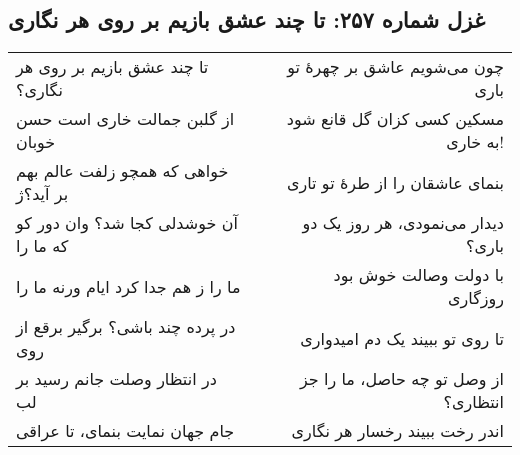\begin{center}
\section*{غزل شماره ۲۵۷: تا چند عشق بازیم بر روی هر نگاری}
\label{sec:257}
\begin{longtable}{l p{0.5cm} r}
تا چند عشق بازیم بر روی هر نگاری؟
&&
چون می‌شویم عاشق بر چهرهٔ تو باری
\\
از گلبن جمالت خاری است حسن خوبان
&&
مسکین کسی کزان گل قانع شود به خاری!
\\
خواهی که همچو زلفت عالم بهم بر آید؟ژ
&&
بنمای عاشقان را از طرهٔ تو تاری
\\
آن خوشدلی کجا شد؟ وان دور کو که ما را
&&
دیدار می‌نمودی، هر روز یک دو باری؟
\\
ما را ز هم جدا کرد ایام ورنه ما را
&&
با دولت وصالت خوش بود روزگاری
\\
در پرده چند باشی؟ برگیر برقع از روی
&&
تا روی تو ببیند یک دم امیدواری
\\
در انتظار وصلت جانم رسید بر لب
&&
از وصل تو چه حاصل، ما را جز انتظاری؟
\\
جام جهان نمایت بنمای، تا عراقی
&&
اندر رخت ببیند رخسار هر نگاری
\\
\end{longtable}
\end{center}
